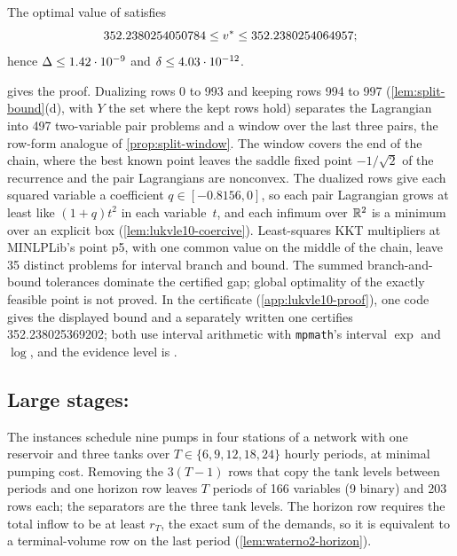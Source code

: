 \begin{theorem}\label{thm:lukvle10-bracket}
The optimal value of  satisfies
\[
  352.2380254050784\le v^{*}\le352.2380254064957;
\]
hence $\Delta\le1.42\cdot 10^{-9}$ and $\delta\le4.03\cdot 10^{-12}$.
\end{theorem}

 gives the proof.
Dualizing rows 0 to 993 and keeping rows 994 to 997 (\cref{lem:split-bound}(d), with $Y$ the set where the kept rows hold) separates the Lagrangian into 497 two-variable pair problems and a window over the last three pairs, the row-form analogue of \cref{prop:split-window}.
The window covers the end of the chain, where the best known point leaves the saddle fixed point $-1/\sqrt2$ of the recurrence and the pair Lagrangians are nonconvex.
The dualized rows give each squared variable a coefficient $q\in[-0.8156,0]$, so each pair Lagrangian grows at least like $(1+q)t^2$ in each variable~$t$, and each infimum over $\mathbb{R}^2$ is a minimum over an explicit box (\cref{lem:lukvle10-coercive}).
Least-squares KKT multipliers at MINLPLib's point p5, with one common value on the middle of the chain, leave 35 distinct problems for interval branch and bound.
The summed branch-and-bound tolerances dominate the certified gap; global optimality of the exactly feasible point is not proved.
In the certificate (\cref{app:lukvle10-proof}), one code gives the displayed bound and a separately written one certifies 352.238025369202; both use interval arithmetic  with \texttt{mpmath}'s interval $\exp$ and $\log$, and the evidence level is .

\subsection{Large stages: }\label{sec:split-waterno2}

The  instances schedule nine pumps in four stations of a network with one reservoir and three tanks \citep{huang2019-optimal-operation-of-water-supply} over $T\in\{6,9,12,18,24\}$ hourly periods, at minimal pumping cost.
Removing the $3(T-1)$ rows that copy the tank levels between periods and one horizon row leaves $T$ periods of 166 variables (9 binary) and 203 rows each; the separators are the three tank levels.
The horizon row requires the total inflow to be at least $r_T$, the exact sum of the demands, so it is equivalent to a terminal-volume row on the last period (\cref{lem:waterno2-horizon}).

